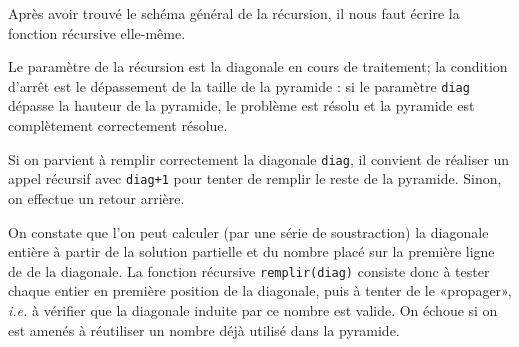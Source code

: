 \documentclass[10pt]{article}\usepackage[correction,nu]{esial}
\begin{document}
  
  \noindent Après avoir trouvé le schéma général de la récursion, il nous faut
  écrire la fonction récursive elle-même.

  Le paramètre de la récursion est la diagonale en cours de traitement; la
  condition d'arrêt est le dépassement de la taille de la pyramide : si le
  paramètre \texttt{diag} dépasse la hauteur de la pyramide, le problème est
  résolu et la pyramide est complètement correctement résolue.

  Si on parvient à remplir correctement la diagonale \texttt{diag}, il convient
  de réaliser un appel récursif avec \texttt{diag+1} pour tenter de remplir le
  reste de la pyramide. Sinon, on effectue un retour arrière.

  On constate que l'on peut calculer (par une série de soustraction) la
  diagonale entière à partir de la solution partielle et du nombre placé sur la
  première ligne de de la diagonale. La fonction récursive
  \texttt{remplir(diag)} consiste donc à tester chaque entier en première
  position de la diagonale, puis à tenter de le «propager», \textit{i.e.} à
  vérifier que la diagonale induite par ce nombre est valide. On échoue si on
  est amenés à réutiliser un nombre déjà utilisé dans la pyramide.
\end{document}

